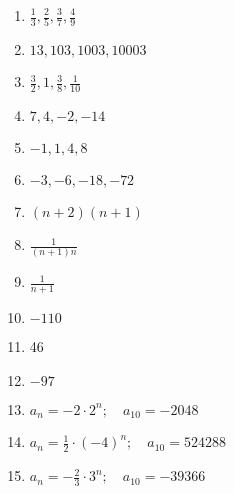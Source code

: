 \documentclass{article}
\begin{document}
\begin{enumerate}
    \setlength\itemsep{11pt}
    \item $\frac{1}{3}, \frac{2}{5}, \frac{3}{7}, \frac{4}{9}$
    \item $13, 103, 1003, 10003$
    \item $\frac{3}{2}, 1, \frac{3}{8}, \frac{1}{10}$
    \item $7, 4, -2, -14$
    \item $-1, 1, 4, 8$
    \item $-3, -6, -18, -72$
    \item $(n+2)(n+1)$
    \item $\frac{1}{(n+1)n}$
    \item $\frac{1}{n+1}$
    \item $-110$
    \item 46
    \item $-97$
    \item $a_n = -2 \cdot 2^{n}; \quad a_{10} = -2048$
    \item $a_n = \frac{1}{2} \cdot (-4)^{n}; \quad a_{10} = 524288$
    \item $a_n = -\frac{2}{3} \cdot 3^{n}; \quad a_{10} = -39366$
\end{enumerate}
\end{document}
